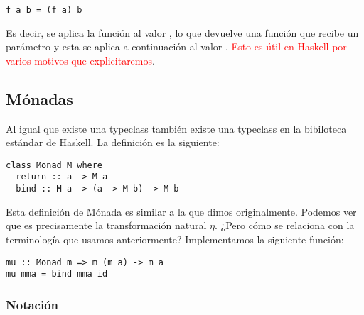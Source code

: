 \begin{verbatim}
f a b = (f a) b
\end{verbatim}

Es decir, se aplica la función  al valor , lo que devuelve
una función que recibe un parámetro  y esta se aplica a continuación
al valor .
\textcolor{red}{Esto es útil en Haskell por varios motivos que explicitaremos}.

\subsection{Mónadas}
Al igual que existe una typeclass  también existe una typeclass
 en la bibiloteca estándar de Haskell. La definición es la siguiente:

\begin{verbatim}
class Monad M where
  return :: a -> M a
  bind :: M a -> (a -> M b) -> M b
\end{verbatim}

Esta definición de Mónada es similar a la que dimos originalmente. Podemos ver
que  es precisamente la transformación natural $\eta$.
¿Pero cómo se relaciona  con la terminología que usamos anteriormente?
Implementamos la siguiente función:

\begin{verbatim}
mu :: Monad m => m (m a) -> m a
mu mma = bind mma id
\end{verbatim}

\subsubsection{Notación }
